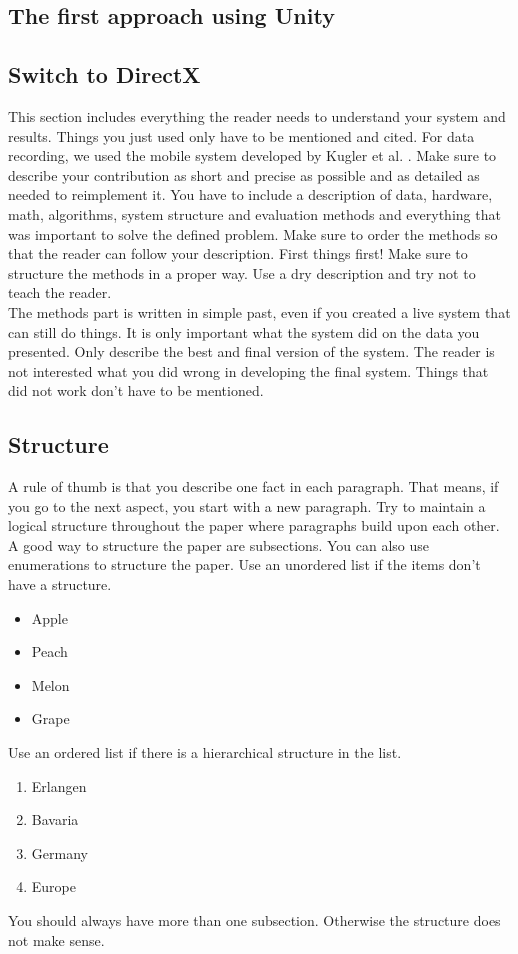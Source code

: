 \subsection{The first approach using Unity}
\subsection{Switch to DirectX}

This section includes everything the reader needs to understand your system and results. Things you just used only have to be mentioned and cited. For data recording, we used the mobile system developed by Kugler et al. \cite{ProceedingsArticle}. Make sure to describe your contribution as short and precise as possible and as detailed as needed to reimplement it. You have to include a description of data, hardware, math, algorithms, system structure and evaluation methods and everything that was important to solve the defined problem. Make sure to order the methods so that the reader can follow your description. First things first! Make sure to structure the methods in a proper way. Use a dry description and try not to teach the reader. \\
The methods part is written in simple past, even if you created a live system that can still do things. It is only important what the system did on the data you presented. Only describe the best and final version of the system. The reader is not interested what you did wrong in developing the final system. Things that did not work don't have to be mentioned.

\subsection{Structure}
A rule of thumb is that you describe one fact in each paragraph. That means, if you go to the next aspect, you start with a new paragraph. Try to maintain a logical structure throughout the paper where paragraphs build upon each other.\\
A good way to structure the paper are subsections. You can also use enumerations to structure the paper. Use an unordered list if the items don't have a structure.
\begin{itemize}
\item Apple
\item Peach
\item Melon
\item Grape
\end{itemize}
Use an ordered list if there is a hierarchical structure in the list.
\begin{enumerate}
\item Erlangen
\item Bavaria
\item Germany
\item Europe
\end{enumerate}
You should always have more than one subsection. Otherwise the structure does not make sense.

